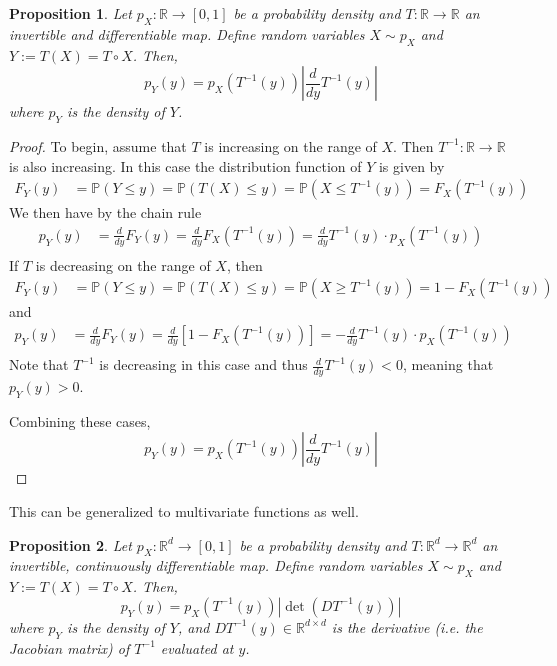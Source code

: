 \documentclass[12pt]{article}
\newcommand*{\abs}[1]{\left\lvert#1\right\rvert}
\newcommand{\R}{\mathcal{R}}
\newcommand{\Prob}{\mathbb{P}}
\def\R{\mathbb{R}}
\newtheorem{prop}{Proposition}
\begin{document}
\begin{prop}
Let $p_X: \R \to [0, 1]$ be a probability density and $T: \R \to \R$ an invertible and differentiable map. Define random variables $X \sim p_X$ and 
$Y := T(X) = T \circ X$. Then, 
\[p_Y(y) = p_X(T^{-1}(y)) \abs{\frac{d}{dy} T^{-1}(y)}\] 
where $p_Y$ is the density of $Y$. 
\end{prop}

\begin{proof}
To begin, assume that $T$ is increasing on the range of $X$. Then $T^{-1}: \R \to \R$ is also increasing. In this case the distribution function of $Y$ is given by 
\begin{align*}
F_Y(y) &= \Prob(Y \leq y) = \Prob(T(X) \leq y) = \Prob(X \leq T^{-1}(y)) = F_X(T^{-1}(y))
\end{align*}
We then have by the chain rule
\begin{align*}
p_Y(y) &=  \frac{d}{dy} F_Y(y) = \frac{d}{dy} F_X(T^{-1}(y)) = \frac{d}{dy} T^{-1}(y) \cdot p_X(T^{-1}(y)) \\
\end{align*}
If $T$ is decreasing on the range of $X$, then 
\begin{align*}
F_Y(y) &= \Prob(Y \leq y) = \Prob(T(X) \leq y) = \Prob(X \geq T^{-1}(y)) = 1 - F_X(T^{-1}(y))
\end{align*}
and
\begin{align*}
p_Y(y) &=  \frac{d}{dy} F_Y(y) = \frac{d}{dy} [1 - F_X(T^{-1}(y))] = -\frac{d}{dy} T^{-1}(y) \cdot p_X(T^{-1}(y)) \\
\end{align*}
Note that $T^{-1}$ is decreasing in this case and thus $\frac{d}{dy} T^{-1}(y) < 0$, meaning that $p_Y(y) > 0$. 

Combining these cases, 
\[p_Y(y) = p_X(T^{-1}(y)) \abs{\frac{d}{dy} T^{-1}(y)}  \]
\end{proof}

This can be generalized to multivariate functions as well. 
\begin{prop} \label{change_of_variables}
Let $p_X: \R^d \to [0, 1]$ be a probability density and $T: \R^d \to \R^d$ an invertible, continuously differentiable map. Define random variables $X \sim p_X$ 
and $Y := T(X) = T \circ X$. Then, 
\[p_Y(y) = p_X(T^{-1}(y)) \abs{\det\left(DT^{-1}(y)\right)}\] 
where $p_Y$ is the density of $Y$, and $DT^{-1}(y) \in \R^{d \times d}$ is the derivative (i.e. the Jacobian matrix) of $T^{-1}$ evaluated at $y$. 
\end{prop}
\end{document}
